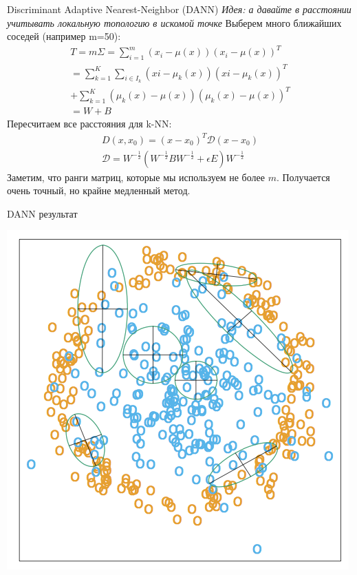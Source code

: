 \documentclass[14pt, fleqn, xcolor={dvipsnames, table}]{beamer}
\begin{document}
\begin{frame}{Discriminant Adaptive Nearest-Neighbor (DANN)}
\small
\emph{Идея: а давайте в расстоянии учитывать локальную топологию в искомой точке}
Выберем много ближайших соседей (например m=50): \\
$$
  \begin{array}{l}
    T = m\Sigma = \sum_{i=1}^m(x_i - \mu(x))(x_i - \mu(x))^T \\
    = \sum_{k=1}^K \sum_{i \in I_k} (xi - \mu_k(x))(xi - \mu_k(x))^T \\
    + \sum_{k=1}^K(\mu_k(x) - \mu(x))(\mu_k(x) - \mu(x))^T \\ 
    = W + B
  \end{array}
$$
Пересчитаем все расстояния для k-NN:
$$
  \begin{array}{l}
    D(x, x_0) = (x - x_0)^T \mathcal{D}(x - x_0) \\
    \mathcal{D}=W^{-\frac{1}{2}} (W^{-\frac{1}{2}} B W^{-\frac{1}{2}} + \epsilon E) W^{-\frac{1}{2}}
  \end{array}
$$
Заметим, что ранги матриц, которые мы используем не более $m$. Получается очень точный, но крайне медленный метод.
\end{frame}

\begin{frame}{DANN результат}
\begin{center}
\includegraphics[height=0.8\textheight]{13_4.png}
\end{center}
\end{frame}
\end{document}
